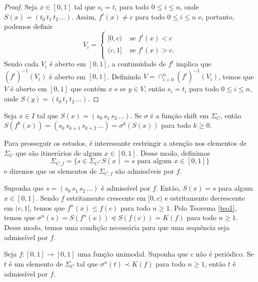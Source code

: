 \begin{proof}
Seja $x \in [0, 1]$ tal que $s_i = t_i$ para todo $0 \leq i \leq n$, onde $S(x) = (t_0\, t_1\, t_2\, \dots)$. Assim, $f^i(x) \neq c$ para todo $0 \leq i \leq n$ e, portanto, podemos definir
\[ V_i = 
\begin{cases} 
  [0, c) & \textrm{ se } f^i(x) < c \\
  (c, 1] & \textrm{ se } f^i(x) > c. \\
\end{cases}
\]
Sendo cada $V_i$ é aberto em $[0, 1]$, a continuidade de $f^i$ implica que $(f^i)^{-1}(V_i)$ é aberto em $[0, 1]$. Definindo $V = \cap_{i=0}^n (f^i)^{-1}(V_i)$, temos que $V$ é aberto em $[0, 1]$ que contém $x$ e se $y \in V$, então $s_i = t_i$ para todo $0 \leq i \leq n$, onde $S(y) = (t_0\, t_1\, t_2\, \dots)$.  
\end{proof}

Seja $x \in I$ tal que $S(x) = (s_0\, s_1\, s_2\, \dots)$. Se $\sigma$ é a função shift em $\Sigma_C$, então $S(f^k(x)) = (s_k\, s_{k+1}\, s_{k+2}\, \dots) = \sigma^k(S(x))$ para todo $k \geq 0$.

Para prosseguir os estudos, é interessante restringir a atenção nos elementos de $\Sigma_C$ que são itinerários de algum $x \in [0, 1]$. Desse modo, definimos
$$\Sigma_{C, f} = \{ s \in \Sigma_C : S(x) = s \text{ para algum } x \in [0, 1] \}$$
e dizemos que os elementos de $\Sigma_{C, f}$ são admissíveis por $f$.

Suponha que $s = (s_0\, s_1\, s_2\, \dots)$ é admissível por $f$. Então, $S(x) = s$ para algum $x \in [0, 1]$. Sendo $f$ estritamente crescente em $[0, c)$ e estritamente decrescente em $(c, 1]$, temos que $f^n(x) \leq f(c)$ para todo $n \geq 1$. Pelo Teorema \ref{teo1}, temos que $\sigma^n(s) = S(f^n(x)) \preceq S(f(c)) = K(f)$ para todo $n \geq 1$. Desse modo, temos uma condição necessária para que uma sequência seja admissível por $f$.

\begin{theorem}
Seja $f: [0, 1] \to [0, 1]$ uma função unimodal. Suponha que $c$ não é periódico. Se $t$ é um elemento de $\Sigma_C$ tal que $\sigma^n(t) \prec K(f)$ para todo $n \geq 1$, então $t$ é admissível por $f$.
\end{theorem}

